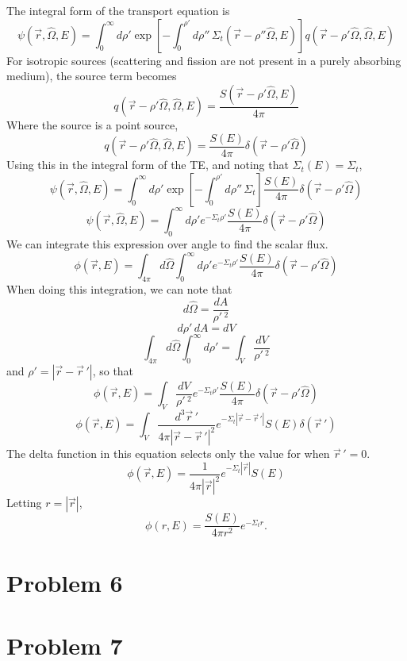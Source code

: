 \documentclass{article}
\newcommand{\Xs}{\Sigma}
\newcommand{\pos}{\vec{r}}
\newcommand{\Oh}{\hat{\Omega}}
\newcommand{\intfp}{\int_{4\pi}}
\newcommand{\intzi}{\int_0^{\infty}}
\begin{document}
The integral form of the transport equation is
$$ \psi(\pos,\Oh,E) = \intzi d\rho' \exp \left[ -\int_0^{\rho'} d\rho'' \, \Xs_t(\pos-\rho''\Oh,E)\right] q(\pos-\rho'\Oh,\Oh,E) $$
For isotropic sources (scattering and fission are not present in a purely absorbing medium), the source term becomes
$$ q(\pos-\rho'\Oh,\Oh,E) = \frac{S(\pos-\rho'\Oh,E)}{4\pi} $$
Where the source is a point source, 
$$ q(\pos-\rho'\Oh,\Oh,E) = \frac{S(E)}{4\pi}\delta(\pos-\rho'\Oh) $$
Using this in the integral form of the TE, and noting that $\Xs_t(E) = \Xs_t$,
$$ \psi(\pos,\Oh,E) = \intzi d\rho' \exp \left[ -\int_0^{\rho'} d\rho'' \, \Xs_t \right] \frac{S(E)}{4\pi}\delta(\pos-\rho'\Oh) $$
$$ \psi(\pos,\Oh,E) = \intzi d\rho' e^{-\Xs_t \rho'} \frac{S(E)}{4\pi}\delta(\pos-\rho'\Oh) $$
We can integrate this expression over angle to find the scalar flux.
$$ \phi(\pos,E) = \intfp d\Oh \intzi d\rho' e^{-\Xs_t \rho'} \frac{S(E)}{4\pi}\delta(\pos-\rho'\Oh) $$
When doing this integration, we can note that
$$ d\Oh = \frac{dA}{\rho'\,^2} $$
$$ d\rho' \, dA = dV $$
$$ \intfp d\Oh \intzi d\rho' = \int_V \frac{dV}{\rho'\, ^2} $$
and $\rho' = |\pos - \pos\,'|$, so that
$$ \phi(\pos,E) = \int_V \frac{dV}{\rho'\, ^2} e^{-\Xs_t \rho'} \frac{S(E)}{4\pi}\delta(\pos-\rho'\Oh) $$
$$ \phi(\pos,E) = \int_V \frac{d^3 \pos\,'}{4\pi |\pos-\pos\,'|^2} e^{-\Xs_t |\pos - \pos\,'|}S(E)\delta(\pos\,') $$
The delta function in this equation selects only the value for when $\pos\,' = 0$. 
$$ \phi(\pos,E) = \frac{1}{4\pi |\pos|^2} e^{-\Xs_t |\pos|}S(E) $$
Letting $r = |\pos|$,
$$\boxed{ \phi(r,E) = \frac{S(E)}{4\pi r^2} e^{-\Xs_t r} }.$$




\section*{Problem 6}





\section*{Problem 7}
\end{document}

